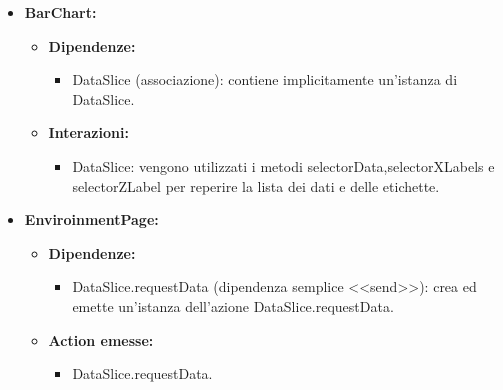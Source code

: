 \begin{itemize}
    \item \textbf{BarChart:}
    \begin{itemize}
        \item \textbf{Dipendenze:}
        \begin{itemize}
            \item DataSlice (associazione): contiene implicitamente un'istanza di DataSlice.
        \end{itemize} 
        \item \textbf{Interazioni:}
        \begin{itemize}
            \item DataSlice: vengono utilizzati i metodi selectorData,selectorXLabels e selectorZLabel per reperire la lista dei dati e delle etichette.
        \end{itemize} 
    \end{itemize}

    \item \textbf{EnviroinmentPage:}
    \begin{itemize}
        \item \textbf{Dipendenze:}
        \begin{itemize}
            \item DataSlice.requestData (dipendenza semplice <<send>>): crea ed emette un’istanza dell’azione DataSlice.requestData.
        \end{itemize} 
        \item \textbf{Action emesse:}
        \begin{itemize}
            \item DataSlice.requestData.
        \end{itemize} 
    \end{itemize}
\end{itemize}

\pagebreak

